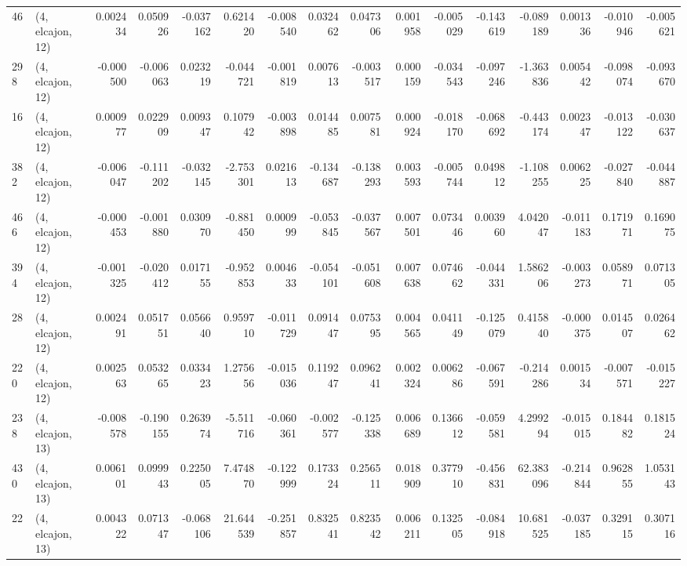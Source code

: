 \begin{tabular}{llrrrrrrrrrrrrrr}
46  &  (4, elcajon, 12) &   0.002434 &  0.050926 & -0.037162 &     0.621420 &  -0.008540 &   0.032462 &   0.047306 &  0.001958 & -0.005029 & -0.143619 &   -0.089189 &  0.001336 & -0.010946 & -0.005621 \\
298 &  (4, elcajon, 12) &  -0.000500 & -0.006063 &  0.023219 &    -0.044721 &  -0.001819 &   0.007613 &  -0.003517 &  0.000159 & -0.034543 & -0.097246 &   -1.363836 &  0.005442 & -0.098074 & -0.093670 \\
16  &  (4, elcajon, 12) &   0.000977 &  0.022909 &  0.009347 &     0.107942 &  -0.003898 &   0.014485 &   0.007581 &  0.000924 & -0.018170 & -0.068692 &   -0.443174 &  0.002347 & -0.013122 & -0.030637 \\
382 &  (4, elcajon, 12) &  -0.006047 & -0.111202 & -0.032145 &    -2.753301 &   0.021613 &  -0.134687 &  -0.138293 &  0.003593 & -0.005744 &  0.049812 &   -1.108255 &  0.006225 & -0.027840 & -0.044887 \\
466 &  (4, elcajon, 12) &  -0.000453 & -0.001880 &  0.030970 &    -0.881450 &   0.000999 &  -0.053845 &  -0.037567 &  0.007501 &  0.073446 &  0.003960 &    4.042047 & -0.011183 &  0.171971 &  0.169075 \\
394 &  (4, elcajon, 12) &  -0.001325 & -0.020412 &  0.017155 &    -0.952853 &   0.004633 &  -0.054101 &  -0.051608 &  0.007638 &  0.074662 & -0.044331 &    1.586206 & -0.003273 &  0.058971 &  0.071305 \\
28  &  (4, elcajon, 12) &   0.002491 &  0.051751 &  0.056640 &     0.959710 &  -0.011729 &   0.091447 &   0.075395 &  0.004565 &  0.041149 & -0.125079 &    0.415840 & -0.000375 &  0.014507 &  0.026462 \\
220 &  (4, elcajon, 12) &   0.002563 &  0.053265 &  0.033423 &     1.275656 &  -0.015036 &   0.119247 &   0.096241 &  0.002324 &  0.006286 & -0.067591 &   -0.214286 &  0.001534 & -0.007571 & -0.015227 \\
238 &  (4, elcajon, 13) &  -0.008578 & -0.190155 &  0.263974 &    -5.511716 &  -0.060361 &  -0.002577 &  -0.125338 &  0.006689 &  0.136612 & -0.059581 &    4.299294 & -0.015015 &  0.184482 &  0.181524 \\
430 &  (4, elcajon, 13) &   0.006101 &  0.099943 &  0.225005 &     7.474870 &  -0.122999 &   0.173324 &   0.256511 &  0.018909 &  0.377910 & -0.456831 &   62.383096 & -0.214844 &  0.962855 &  1.053143 \\
22  &  (4, elcajon, 13) &   0.004322 &  0.071347 & -0.068106 &    21.644539 &  -0.251857 &   0.832541 &   0.823542 &  0.006211 &  0.132505 & -0.084918 &   10.681525 & -0.037185 &  0.329115 &  0.307116 \\

\end{tabular}
